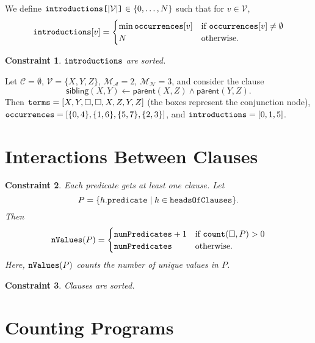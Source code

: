 \documentclass[runningheads]{llncs}
\newtheorem{constraint}{Constraint}
\newcommand{\variable}[1]{\texttt{\textup{#1}}}
\newcommand{\arrayd}[3]{\variable{{#1}[}{#2}\variable{]} \in {#3}}
\newcommand{\variables}{\mathcal{V}}
\newcommand{\constants}{\mathcal{C}}
\newcommand{\maxArity}{\mathcal{M}_{\mathcal{A}}}
\newcommand{\maxNumNodes}{\mathcal{M}_{\mathcal{N}}}
\begin{document}
\begin{definition}
  We define $\arrayd{introductions}{|\variables{}|}{\{ 0, \dots, N \}}$ such
  that for $v \in \variables{}$,
  \[
    \variable{introductions}[v] = \begin{cases}
      \min \variable{occurrences}[v] & \text{if }
      \variable{occurrences}[v] \ne \emptyset\\
      N & \text{otherwise.}
    \end{cases}
  \]
\end{definition}

\begin{constraint}
  $\variable{introductions}$ are sorted.
\end{constraint}

\begin{example}
  Let $\constants{} = \emptyset$, $\variables{} = \{ X, Y, Z \}$, $\maxArity{} =
  2$, $\maxNumNodes{} = 3$, and consider the clause
  \[
    \mathsf{sibling}(X, Y) \gets \mathsf{parent}(X, Z) \land
    \mathsf{parent}(Y, Z).
  \]
  Then $\variable{terms} = [X, Y, \Box, \Box, X, Z, Y, Z]$ (the boxes represent
  the conjunction node), $\variable{occurrences} = [\{ 0, 4 \}, \{ 1, 6 \},
  \{ 5, 7 \}, \{ 2, 3 \}]$, and $\variable{introductions} = [0, 1, 5]$.
\end{example}

\section{Interactions Between Clauses}

\begin{constraint}
  Each predicate gets at least one clause. Let
  \[
    P = \{ h.\variable{predicate} \mid h \in \variable{headsOfClauses} \}.
  \]
  Then
  \[
    \variable{nValues}(P) =
    \begin{cases}
      \variable{numPredicates} + 1 & \text{if } \variable{count}(\Box, P) > 0 \\
      \variable{numPredicates} & \text{otherwise.}
    \end{cases}
  \]
  Here, $\variable{nValues}(P)$ counts the number of unique values in $P$.
\end{constraint}

\begin{constraint}
  Clauses are sorted.
\end{constraint}

\section{Counting Programs}
\end{document}

